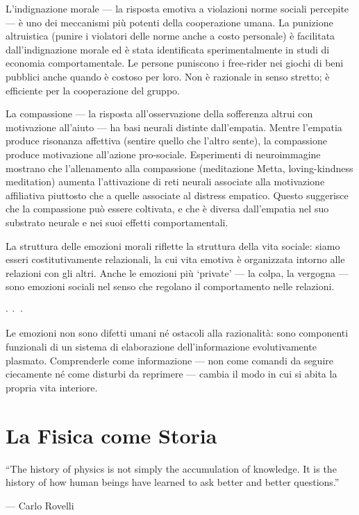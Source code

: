 \documentclass[12pt,a4paper,openany]{book}
\newcommand{\puntini}{\begin{center}$\cdot\ \cdot\ \cdot$\end{center}\vspace{0.3em}}
\begin{document}
L'indignazione morale --- la risposta emotiva a violazioni norme sociali percepite --- è uno dei meccanismi più potenti della cooperazione umana. La punizione altruistica (punire i violatori delle norme anche a costo personale) è facilitata dall'indignazione morale ed è stata identificata sperimentalmente in studi di economia comportamentale. Le persone puniscono i free-rider nei giochi di beni pubblici anche quando è costoso per loro. Non è razionale in senso stretto; è efficiente per la cooperazione del gruppo.

La compassione --- la risposta all'osservazione della sofferenza altrui con motivazione all'aiuto --- ha basi neurali distinte dall'empatia. Mentre l'empatia produce risonanza affettiva (sentire quello che l'altro sente), la compassione produce motivazione all'azione pro-sociale. Esperimenti di neuroimmagine mostrano che l'allenamento alla compassione (meditazione Metta, loving-kindness meditation) aumenta l'attivazione di reti neurali associate alla motivazione affiliativa piuttosto che a quelle associate al distress empatico. Questo suggerisce che la compassione può essere coltivata, e che è diversa dall'empatia nel suo substrato neurale e nei suoi effetti comportamentali.

La struttura delle emozioni morali riflette la struttura della vita sociale: siamo esseri costitutivamente relazionali, la cui vita emotiva è organizzata intorno alle relazioni con gli altri. Anche le emozioni più `private' --- la colpa, la vergogna --- sono emozioni sociali nel senso che regolano il comportamento nelle relazioni.

\puntini

Le emozioni non sono difetti umani né ostacoli alla razionalità: sono componenti funzionali di un sistema di elaborazione dell'informazione evolutivamente plasmato. Comprenderle come informazione --- non come comandi da seguire ciecamente né come disturbi da reprimere --- cambia il modo in cui si abita la propria vita interiore.

\chapter{La Fisica come Storia}

\epigraph{``The history of physics is not simply the accumulation of knowledge. It is the history of how human beings have learned to ask better and better questions.''}{--- Carlo Rovelli}
\end{document}
